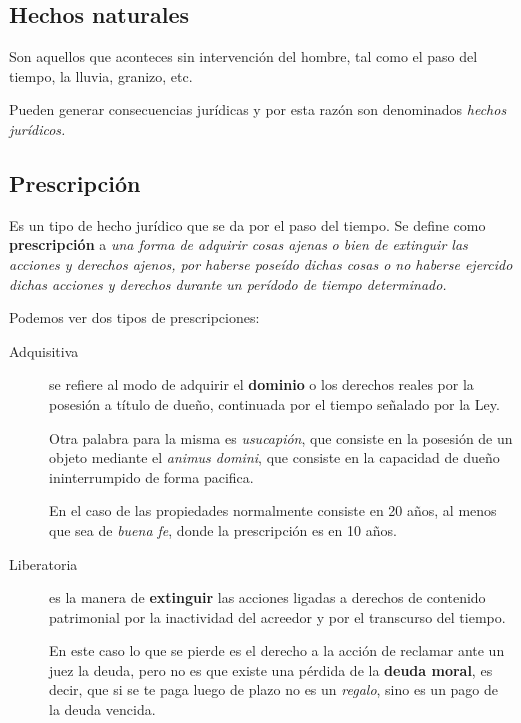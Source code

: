 \documentclass[../resumen.tex]{subfiles}
\begin{document}
\subsection{Hechos naturales}

Son aquellos que aconteces sin intervención del hombre, tal como el paso del tiempo,
la lluvia, granizo, etc.

Pueden generar consecuencias jurídicas y por esta razón son denominados \textit{hechos}
\textit{jurídicos.} 

\subsection{Prescripción}

Es un tipo de hecho jurídico que se da por el paso del tiempo.
Se define como \textbf{prescripción} a \textit{una forma de adquirir cosas ajenas}
\textit{o bien de extinguir las acciones y derechos ajenos, por haberse poseído}
\textit{dichas cosas o no haberse ejercido dichas acciones y derechos durante}
\textit{un perídodo de tiempo determinado.}

Podemos ver dos tipos de prescripciones:

\begin{description}
  \item[Adquisitiva] se refiere al modo de adquirir el \textbf{dominio} o los
    derechos reales por la posesión a título de dueño, continuada por el tiempo
    señalado por la Ley.

    Otra palabra para la misma es \textit{usucapión}, que consiste en la posesión
    de un objeto mediante el \textit{animus domini}, que consiste en la capacidad
    de dueño ininterrumpido de forma pacifica.

    En el caso de las propiedades normalmente consiste en 20 años, al menos que
    sea de \textit{buena fe}, donde la prescripción es en 10 años.

  \item[Liberatoria]  es la manera de \textbf{extinguir} las acciones ligadas a 
    derechos de contenido patrimonial por la inactividad del acreedor y por el
    transcurso del tiempo. 

    En este caso lo que se pierde es el derecho a la acción
    de reclamar ante un juez la deuda, pero no es que existe una pérdida de la
    \textbf{deuda moral}, es decir, que si se te paga luego de plazo no es un 
    \textit{regalo}, sino es un pago de la deuda vencida.
\end{description}
\end{document}
